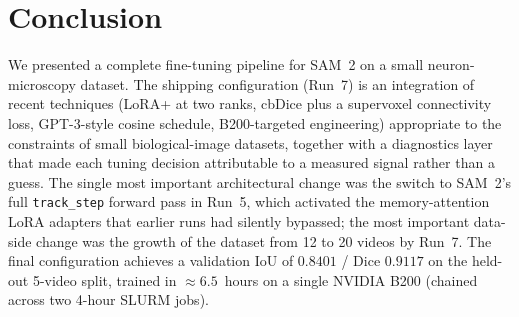 \documentclass[11pt,a4paper]{article}
\begin{document}
\section{Conclusion}

We presented a complete fine-tuning pipeline for SAM~2 on a small
neuron-microscopy dataset. The shipping configuration (Run~7) is an
integration of recent techniques (LoRA+ at two ranks, cbDice plus a
supervoxel connectivity loss, GPT-3-style cosine schedule,
B200-targeted engineering) appropriate to the constraints of small
biological-image datasets, together with a diagnostics layer that
made each tuning decision attributable to a measured signal rather
than a guess. The single most important architectural change was the
switch to SAM~2's full \texttt{track\_step} forward pass in Run~5,
which activated the memory-attention LoRA adapters that earlier runs
had silently bypassed; the most important data-side change was the
growth of the dataset from 12 to 20 videos by Run~7. The final
configuration achieves a validation IoU of $0.8401$ / Dice $0.9117$
on the held-out 5-video split, trained in $\approx 6.5$~hours on a
single NVIDIA B200 (chained across two 4-hour SLURM jobs).
\end{document}
